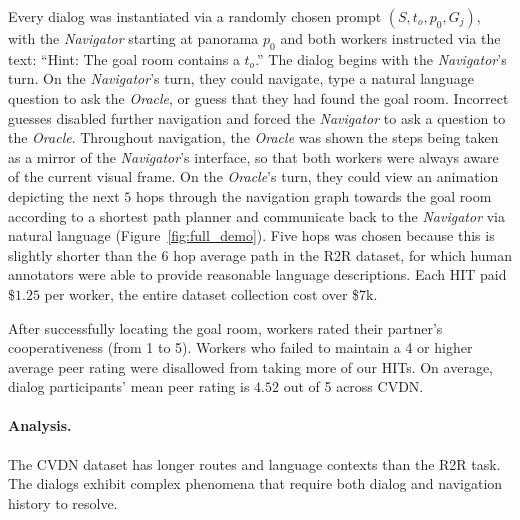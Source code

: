 \documentclass{article}
\newcommand{\dataset}{CVDN}
\newcommand{\nav}{\textit{Navigator}}
\newcommand{\ora}{\textit{Oracle}}
\begin{document}
Every dialog was instantiated via a randomly chosen prompt $(S, t_o, p_0, G_j)$, with the \nav{} starting at panorama $p_0$ and both workers instructed via the text: ``Hint: The goal room contains a $t_o$.''
The dialog begins with the \nav{}'s turn.
On the \nav{}'s turn, they could navigate, type a natural language question to ask the \ora{}, or guess that they had found the goal room.
Incorrect guesses disabled further navigation and forced the \nav{} to ask a question to the \ora{}.
Throughout navigation, the \ora{} was shown the steps being taken as a mirror of the \nav{}'s interface, so that both workers were always aware of the current visual frame.
On the \ora{}'s turn, they could view an animation depicting the next $5$ hops through the navigation graph towards the goal room according to a shortest path planner and communicate back to the \nav{} via natural language (Figure~\ref{fig:full_demo}).
Five hops was chosen because this is slightly shorter than the $6$ hop average path in the R2R dataset, for which human annotators were able to provide reasonable language descriptions.
Each HIT paid $\$1.25$ per worker, the entire dataset collection cost over \$7k.

After successfully locating the goal room, workers rated their partner's cooperativeness (from 1 to 5).
Workers who failed to maintain a 4 or higher average peer rating were disallowed from taking more of our HITs.
On average, dialog participants' mean peer rating is $4.52$ out of 5 across \dataset{}.

\paragraph{Analysis.}
The \dataset{} dataset has longer routes and language contexts than the R2R task.
The dialogs exhibit complex phenomena that require both dialog and navigation history to resolve.
\end{document}
